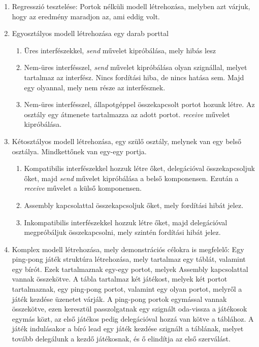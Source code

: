 \documentclass[a4paper,12pt]{report}
\begin{document}
\begin{enumerate}
\item Regresszió tesztelése: Portok nélküli modell létrehozása, melyben azt várjuk, hogy az eredmény maradjon az, ami eddig volt.
\item Egyosztályos modell létrehozása egy darab porttal
\begin{enumerate}
\item Üres interfészekkel, \textit{send} művelet kipróbálása, mely hibás lesz
\item Nem-üres interfésszel, \textit{send} művelet kipróbálása olyan szignállal, melyet tartalmaz az interfész. Nincs fordítási hiba, de nincs hatása sem. Majd egy olyannal, mely nem része az interfésznek.
\item Nem-üres interfésszel, állapotgéppel összekapcsolt portot hozunk létre. Az osztály egy átmenete tartalmazza az adott portot. \textit{receive} művelet kipróbálása.
\end{enumerate}
\item Kétosztályos modell létrehozása, egy szülő osztály, melynek van egy belső osztálya. Mindkettőnek van egy-egy portja.
\begin{enumerate}
\item Kompatibilis interfészekkel hozzuk létre őket, delegációval összekapcsoljuk őket, majd \textit{send} művelet kipróbálása a belső komponensen. Ezután a \textit{receive} művelet a külső komponensen.
\item Assembly kapcsolattal összekapcsoljuk őket, mely fordítási hibát jelez.
\item Inkompatibilis interfészekkel hozzuk létre őket, majd delegációval megpróbáljuk összekapcsolni, mely szintén fordítási hibát jelez.
\end{enumerate}
\item Komplex modell létrehozása, mely demonstrációs célokra is megfelelő: Egy ping-pong játék struktúra létrehozása, mely tartalmaz egy táblát, valamint egy bírót. Ezek tartalmaznak egy-egy portot, melyek Assembly kapcsolattal vannak összekötve. A tábla tartalmaz két játékost, melyek két portot tartalmaznak, egy ping-pong portot, valamint egy olyan portot, melyről a játék kezdése üzenetet várják. A ping-pong portok egymással vannak összekötve, ezen keresztül passzolgatnak egy szignált oda-vissza a játékosok egymás közt, az első játékos pedig delegációval hozzá van kötve a táblához. A játék indulásakor a bíró lead egy játék kezdése szignált a táblának, melyet tovább delegálunk a kezdő játékosnak, és ő elindítja az első szerválást.
\end{enumerate}
\end{document}
